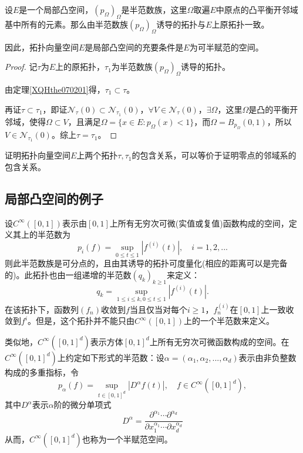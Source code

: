 \begin{theorem}
	设$E$是一个局部凸空间，$(p_{\Omega})_{\Omega} $是半范数族，这里$\Omega$取遍$E$中原点的凸平衡开邻域基中所有的元素。那么由半范数族$(p_{\Omega})_{\Omega} $诱导的拓扑与$E$上原拓扑一致。\par
	因此，拓扑向量空间$E$是局部凸空间的充要条件是$E$为可半赋范的空间。
\end{theorem}

\begin{proof}
	记$\tau$为$E$上的原拓扑，$\tau_{1}$为半范数族$(p_{\Omega})_{\Omega}$诱导的拓扑。\par
	由定理\ref{XQHthe070201}得，$\tau_{1}\subset\tau $。\par
	再证$\tau \subset \tau_{1}$，即证$\mathcal{N}_{\tau}(0)\subset\mathcal{N}_{\tau_{1}}(0) $，$\forall V\in \mathcal{N}_{\tau}(0) $，$\exists \Omega$，这里$\Omega$是凸的平衡开邻域，使得$\Omega\subset V$，且满足$\Omega=\{x\in E:p_{\Omega}(x)<1\} $，而$\Omega=B_{p_{\Omega}}(0,1)$，所以$V\in \mathcal{N}_{\tau_{1}}(0)$。综上$\tau=\tau_{1}$。
\end{proof}

\begin{remark}
	证明拓扑向量空间$E$上两个拓扑$\tau,\tau_{1}$的包含关系，可以等价于证明零点的邻域系的包含关系。
\end{remark}



\subsection{局部凸空间的例子}

\begin{example}
	设$C^{\infty}([0,1]) $表示由$[0,1]$上所有无穷次可微(实值或复值)函数构成的空间，定义其上的半范数为
	\begin{equation*}
		p_{i}(f)=\sup_{0\leq t\leq 1}|f^{(i)}(t)|,\quad i=1,2,...
	\end{equation*}
	则此半范数族是可分点的，且由其诱导的拓扑可度量化(相应的距离可以是完备的)。此拓扑也由一组递增的半范数$(q_{k})_{k\geq 1} $来定义：
	\begin{equation*}
		q_{k}=\sup_{1\leq i\leq k,0\leq t\leq 1}|f^{(i)}(t)|.
	\end{equation*}
	在该拓扑下，函数列$(f_{n})$收敛到$f$当且仅当对每个$i\geq 1$，$f_{n}^{(i)} $在$[0,1]$上一致收敛到$f^{i}$。但是，这个拓扑并不能只由$C^{\infty}([0,1]) $上的一个半范数来定义。
	\par
	类似地，$C^{\infty}([0,1]^{d})$表示方体$[0,1]^{d}$上所有无穷次可微函数构成的空间。在$C^{\infty}([0,1]^{d}) $上约定如下形式的半范数：设$\alpha=(\alpha_{1},\alpha_{2},...,\alpha_{d})$表示由非负整数构成的多重指标，令
	\begin{equation*}
		p_{\alpha}(f)=\sup_{t\in [0,1]^{d}}|D^{\alpha}f(t)|,\quad f\in C^{\infty}([0,1]^{d}),
	\end{equation*}
	其中$D^{\alpha}$表示$\alpha$阶的微分单项式
	\begin{equation*}
		D^{\alpha}=\frac{\partial^{\alpha_{1}} \cdots\partial^{\alpha_{d}}}{\partial x_{1}^{\alpha_{1}}\cdots\partial x_{d}^{\alpha_{d}}}
	\end{equation*}
	从而，$C^{\infty}([0,1]^{d})$也称为一个半赋范空间。
\end{example}

